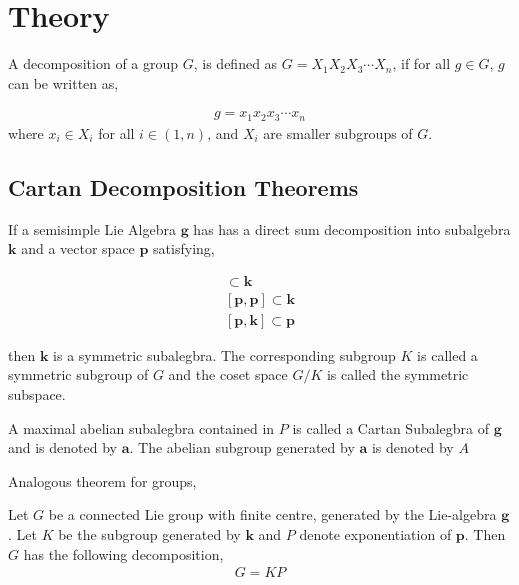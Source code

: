 \section*{Theory}

\begin{defn}

 A decomposition of a group $G$, is defined as $G=X_1X_2X_3\cdots X_n$, if for all $g\in G$, $g$ can be written as,

\begin{align*}
    g=x_1x_2x_3\cdots x_n
\end{align*}
where $x_i\in X_i$ for all $i\in (1,n)$, and $X_i$ are smaller subgroups of $G$.


\end{defn}

\subsection*{Cartan Decomposition Theorems}\cite{divakaran1980decomposition}


\begin{thm}
If a semisimple Lie Algebra $\mathbf{g}$ has has a direct sum decomposition into subalgebra $\mathbf{k}$ and a vector space $\mathbf{p}$ satisfying,

\begin{align*}
    [\mathbf{k},\mathbf{k}] \subset \mathbf{k}\\
    [\mathbf{p},\mathbf{p}] \subset \mathbf{k}\\
    [\mathbf{p},\mathbf{k}] \subset \mathbf{p}
\end{align*}

then $\mathbf{k}$ is a symmetric subalegbra. The corresponding subgroup $K$ is called a symmetric subgroup of $G$ and the coset space $G/K$ is called the symmetric subspace.
\end{thm}



\begin{defn}
 A maximal abelian subalegbra contained in $P$ is called a Cartan Subalegbra of $\mathbf{g}$ and is denoted by $\mathbf{a}$. The abelian subgroup generated by $\mathbf{a}$ is denoted by $A$
\end{defn}

Analogous theorem for groups,

\begin{thm}
    Let $G$ be a connected Lie group with finite centre, generated by the Lie-algebra $\mathbf{g}$. Let $K$ be the subgroup generated by $\mathbf{k}$ and $P$ denote exponentiation of $\mathbf{p}$. Then $G$ has the following decomposition,
    \begin{align*}
        G=KP
    \end{align*}
\end{thm}


